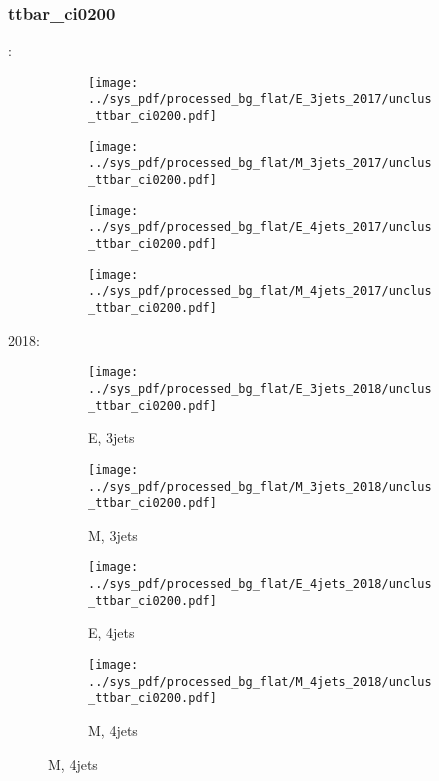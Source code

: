 \documentclass{beamer}
\begin{document}
\begin{frame}
\frametitle{ttbar_ci0200}
\fontsize{5}{1}:
\begin{figure}
\centering
\begin{subfigure}[b]{0.24\textwidth}
\texttt{[image: ../sys\_pdf/processed\_bg\_flat/E\_3jets\_2017/unclus\_ttbar\_ci0200.pdf]}
\end{subfigure}
\begin{subfigure}[b]{0.24\textwidth}
\texttt{[image: ../sys\_pdf/processed\_bg\_flat/M\_3jets\_2017/unclus\_ttbar\_ci0200.pdf]}
\end{subfigure}
\begin{subfigure}[b]{0.24\textwidth}
\texttt{[image: ../sys\_pdf/processed\_bg\_flat/E\_4jets\_2017/unclus\_ttbar\_ci0200.pdf]}
\end{subfigure}
\begin{subfigure}[b]{0.24\textwidth}
\texttt{[image: ../sys\_pdf/processed\_bg\_flat/M\_4jets\_2017/unclus\_ttbar\_ci0200.pdf]}
\end{subfigure}
\end{figure}
2018:
\begin{figure}
\centering
\begin{subfigure}[b]{0.24\textwidth}
\texttt{[image: ../sys\_pdf/processed\_bg\_flat/E\_3jets\_2018/unclus\_ttbar\_ci0200.pdf]}
\captionsetup{font=tiny}
\caption{E, 3jets}
\end{subfigure}
\begin{subfigure}[b]{0.24\textwidth}
\texttt{[image: ../sys\_pdf/processed\_bg\_flat/M\_3jets\_2018/unclus\_ttbar\_ci0200.pdf]}
\captionsetup{font=tiny}
\caption{M, 3jets}
\end{subfigure}
\begin{subfigure}[b]{0.24\textwidth}
\texttt{[image: ../sys\_pdf/processed\_bg\_flat/E\_4jets\_2018/unclus\_ttbar\_ci0200.pdf]}
\captionsetup{font=tiny}
\caption{E, 4jets}
\end{subfigure}
\begin{subfigure}[b]{0.24\textwidth}
\texttt{[image: ../sys\_pdf/processed\_bg\_flat/M\_4jets\_2018/unclus\_ttbar\_ci0200.pdf]}
\captionsetup{font=tiny}
\caption{M, 4jets}
\end{subfigure}
\end{figure}
\end{frame}
\end{document}
